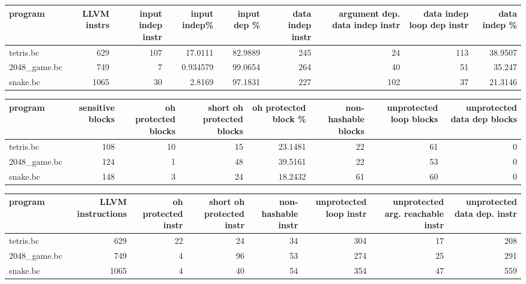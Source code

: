 \begin{tabular}{lrrrrrrrr}
\hline
 program      &   LLVM instrs &   input indep instr &   input indep\% &   input dep \% &   data indep instr &   argument dep. data indep instr &   data indep loop dep instr &   data indep \% \\
\hline
 tetris.bc    &           629 &                 107 &      17.0111   &       82.9889 &                245 &                               24 &                         113 &        38.9507 \\
 2048\_game.bc &           749 &                   7 &       0.934579 &       99.0654 &                264 &                               40 &                          51 &        35.247  \\
 snake.bc     &          1065 &                  30 &       2.8169   &       97.1831 &                227 &                              102 &                          37 &        21.3146 \\
\hline
\end{tabular}\begin{tabular}{lrrrrrrr}
\hline
 program      &   sensitive blocks &   oh protected blocks &   short oh protected blocks &   oh protected block \% &   non-hashable blocks &   unprotected loop blocks &   unprotected data dep blocks \\
\hline
 tetris.bc    &                108 &                    10 &                          15 &                23.1481 &                    22 &                        61 &                             0 \\
 2048\_game.bc &                124 &                     1 &                          48 &                39.5161 &                    22 &                        53 &                             0 \\
 snake.bc     &                148 &                     3 &                          24 &                18.2432 &                    61 &                        60 &                             0 \\
\hline
\end{tabular}\begin{tabular}{lrrrrrrr}
\hline
 program      &   LLVM instructions &   oh protected instr &   short oh protected instr &   non-hashable instr &   unprotected loop instr &   unprotected arg. reachable instr &   unprotected data dep. instr \\
\hline
 tetris.bc    &                 629 &                   22 &                         24 &                   34 &                      304 &                                 17 &                           208 \\
 2048\_game.bc &                 749 &                    4 &                         96 &                   53 &                      274 &                                 25 &                           291 \\
 snake.bc     &                1065 &                    4 &                         40 &                   54 &                      354 &                                 47 &                           559 \\
\hline
\end{tabular}